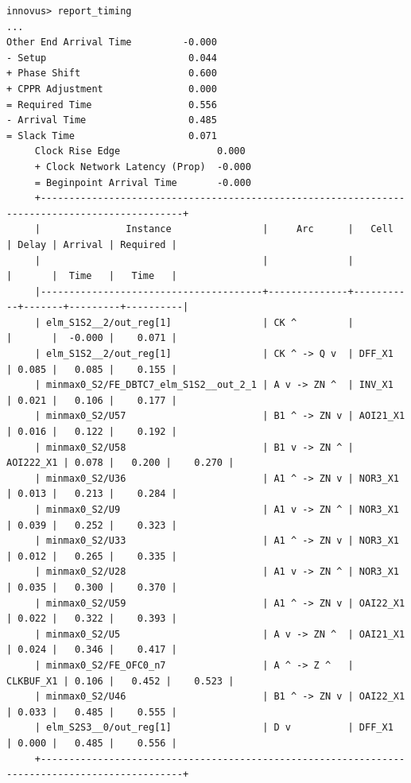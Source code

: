 \documentclass[a4paper,12pt,twoside]{article}
\begin{document}
\begin{verbatim}
innovus> report_timing
...
Other End Arrival Time         -0.000
- Setup                         0.044
+ Phase Shift                   0.600
+ CPPR Adjustment               0.000
= Required Time                 0.556
- Arrival Time                  0.485
= Slack Time                    0.071
     Clock Rise Edge                 0.000
     + Clock Network Latency (Prop)  -0.000
     = Beginpoint Arrival Time       -0.000
     +-----------------------------------------------------------------------------------------------+
     |               Instance                |     Arc      |   Cell    | Delay | Arrival | Required |
     |                                       |              |           |       |  Time   |   Time   |
     |---------------------------------------+--------------+-----------+-------+---------+----------|
     | elm_S1S2__2/out_reg[1]                | CK ^         |           |       |  -0.000 |    0.071 |
     | elm_S1S2__2/out_reg[1]                | CK ^ -> Q v  | DFF_X1    | 0.085 |   0.085 |    0.155 |
     | minmax0_S2/FE_DBTC7_elm_S1S2__out_2_1 | A v -> ZN ^  | INV_X1    | 0.021 |   0.106 |    0.177 |
     | minmax0_S2/U57                        | B1 ^ -> ZN v | AOI21_X1  | 0.016 |   0.122 |    0.192 |
     | minmax0_S2/U58                        | B1 v -> ZN ^ | AOI222_X1 | 0.078 |   0.200 |    0.270 |
     | minmax0_S2/U36                        | A1 ^ -> ZN v | NOR3_X1   | 0.013 |   0.213 |    0.284 |
     | minmax0_S2/U9                         | A1 v -> ZN ^ | NOR3_X1   | 0.039 |   0.252 |    0.323 |
     | minmax0_S2/U33                        | A1 ^ -> ZN v | NOR3_X1   | 0.012 |   0.265 |    0.335 |
     | minmax0_S2/U28                        | A1 v -> ZN ^ | NOR3_X1   | 0.035 |   0.300 |    0.370 |
     | minmax0_S2/U59                        | A1 ^ -> ZN v | OAI22_X1  | 0.022 |   0.322 |    0.393 |
     | minmax0_S2/U5                         | A v -> ZN ^  | OAI21_X1  | 0.024 |   0.346 |    0.417 |
     | minmax0_S2/FE_OFC0_n7                 | A ^ -> Z ^   | CLKBUF_X1 | 0.106 |   0.452 |    0.523 |
     | minmax0_S2/U46                        | B1 ^ -> ZN v | OAI22_X1  | 0.033 |   0.485 |    0.555 |
     | elm_S2S3__0/out_reg[1]                | D v          | DFF_X1    | 0.000 |   0.485 |    0.556 |
     +-----------------------------------------------------------------------------------------------+
\end{verbatim}
\end{document}

